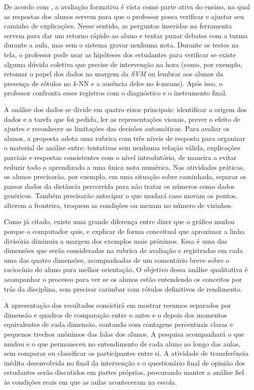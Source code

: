 De acordo com , a avaliação formativa é vista como parte ativa do ensino, na qual as respostas dos alunos servem para que o professor possa verificar e ajustar seu caminho de explicações. Nesse sentido, as perguntas inseridas na ferramenta servem para dar um retorno rápido ao aluno e tentar puxar debates com a turma durante a aula, mas sem o sistema gravar nenhuma nota. Durante os testes na tela, o professor pode usar as hipóteses dos estudantes para verificar se existe alguma dúvida coletiva que precise de intervenção na hora (como, por exemplo, retomar o papel dos dados na margem da \textit{SVM} ou lembrar aos alunos da presença de rótulos no \textit{k}-NN e a ausência deles no \textit{k}-means). Após isso, o professor confronta esses registros com o diagnóstico e o instrumento final.

A análise dos dados se divide em quatro eixos principais: identificar a origem dos dados e a tarefa que foi pedida, ler as representações visuais, prever o efeito de ajustes e reconhecer as limitações das decisões automáticas. Para avaliar os alunos, a proposta adota uma rubrica com três níveis de resposta para organizar o material de análise entre: tentativas sem nenhuma relação válida, explicações parciais e respostas consistentes com o nível introdutório, de maneira a evitar reduzir todo o aprendizado a uma única nota numérica. Nas atividades práticas, os alunos precisarão, por exemplo, em uma situação sobre caminhada, separar os passos dados da distância percorrida para não tratar os números como dados genéricos. Também precisarão antecipar o que mudará caso movam os pontos, alterem a fronteira, troquem as condições ou mexam no número de vizinhos.

Como já citado, existe uma grande diferença entre dizer que o gráfico mudou porque o computador quis, e explicar de forma conceitual que aproximar a linha divisória diminuiu a margem dos exemplos mais próximos. Essa é uma das dimensões que serão consideradas na rubrica de avaliação e registradas em cada uma das quatro dimensões, acompanhadas de um comentário breve sobre o raciocínio do aluno para melhor orientação. O objetivo dessa análise qualitativa é acompanhar o processo para ver se os alunos estão entendendo os conceitos por trás da disciplina, sem precisar carimbar com rótulos definitivos de rendimento.

A apresentação dos resultados consistirá em mostrar resumos separados por dimensão e quadros de comparação entre o antes e o depois dos momentos equivalentes de cada dimensão, contando com contagens percentuais claras e pequenos trechos anônimos das falas dos alunos. A pesquisa acompanhará o que mudou e o que permaneceu no entendimento de cada aluno ao longo das aulas, sem comparar ou classificar os participantes entre si. A atividade de transferência inédita desenvolvida no final da intervenção e o questionário final de opinião dos estudantes serão discutidos em partes próprias, procurando manter a análise fiel às condições reais em que as aulas aconteceram na escola.

